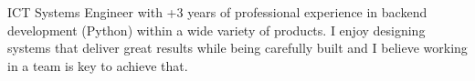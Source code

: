 

\begin{cvparagraph}

ICT Systems Engineer with +3 years of professional experience in backend development (Python)
within a wide variety of products. I enjoy designing systems that deliver great results while being carefully built 
and I believe working in a team is key to achieve that.

\end{cvparagraph}

